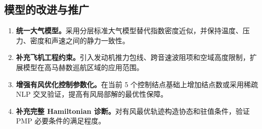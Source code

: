 \documentclass[withoutpreface,bwprint]{cumcmthesis}
\begin{document}
\subsection{模型的改进与推广}

\begin{enumerate}[left=0pt]
\item \textbf{统一大气模型。}采用分层标准大气模型替代指数密度近似，并保持温度、压力、密度和声速之间的静力一致性。
\item \textbf{补充飞机工程约束。}引入发动机推力包线、跨音速波阻项和空域高度限制，扩展模型在高马赫数巡航区域的应用范围。
\item \textbf{增强有风优化控制参数化。}在当前 5 个控制结点基础上增加结点数或采用稀疏 NLP 交叉验证，提高有风局部解的最优性保障。
\item \textbf{补充完整 Hamiltonian 诊断。}对有风最优轨迹构造协态和驻值条件，验证 PMP 必要条件的满足程度。
\end{enumerate}
\end{document}
